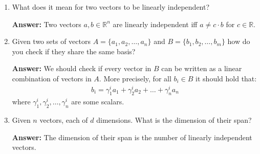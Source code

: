 \documentclass{article}
\newenvironment{QandA}{\begin{enumerate}[label=\arabic*.]}{\end{enumerate}}
\newenvironment{answer}{\par\normalfont \textbf{Answer:}}{}
\newcommand{\R}{\mathbb{R}}
\begin{document}
\begin{QandA}
    \item What does it mean for two vectors to be linearly independent?
    \begin{answer}
        Two vectors $a, b \in \R^n$ are linearly independent iff $a \neq c \cdot b$ for $c \in \R$.
    \end{answer}
    
    \item Given two sets of vectors $A = \{ a_1, a_2, \ldots, a_n\}$ and $B = \{b_1, b_2, \ldots, b_m\}$ how do you check if they share the same basis?
    \begin{answer}
         We should check if every vector in $B$ can be written as a linear combination of vectors in $A$. More precisely, for all $b_i \in B$ it should hold that:
         \begin{align*}
             b_i = \gamma_1^i a_1 + \gamma_2^i a_2 + \ldots + \gamma_n^i a_n
         \end{align*}
         where $\gamma_1^i, \gamma_2^i, \ldots, \gamma_n^i$ are some scalars.
    \end{answer}
    
    \item Given $n$ vectors, each of $d$ dimensions. What is the dimension of their span?
    \begin{answer}
        The dimension of their span is the number of linearly independent vectors. 
    \end{answer}


\end{QandA}
\end{document}
